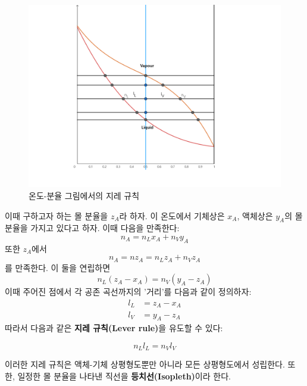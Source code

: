         \begin{figure}[H]
            \centering
            \includegraphics[scale=7]{Images/lgphasediaglever}
            \caption{온도-분율 그림에서의 지레 규칙}\label{f10}
        \end{figure}
        이때 구하고자 하는 몰 분율을 $z_A$라 하자. 이 온도에서 기체상은 $x_A$, 액체상은 $y_A$의 몰 분율을 가지고 있다고 하자. 이때 다음을 만족한다:
        \begin{equation*}
            n_A = n_L x_A + n_V y_A
        \end{equation*}
        또한 $z_A$에서 
        \begin{equation*}
            n_A = nz_A = n_L z_A + n_V z_A
        \end{equation*}
        를 만족한다. 이 둘을 연립하면 
        \begin{equation*}
            n_L\left(z_A - x_A\right) = n_V \left(y_A - z_A\right)
        \end{equation*}
        이때 주어진 점에서 각 공존 곡선까지의 '거리'를 다음과 같이 정의하자:
        \begin{align*}
        l_L &= z_A-x_A\\
        l_V &= y_A-z_A
        \end{align*}
        따라서 다음과 같은 \textbf{지레 규칙(Lever rule)}을 유도할 수 있다:
        \begin{law}[지레 규칙]
        \begin{equation*}
            n_L l_L = n_V l_V
        \end{equation*}
        \end{law}
        이러한 지레 규칙은 액체-기체 상평형도뿐만 아니라 모든 상평형도에서 성립한다. 또한, 일정한 몰 분율을 나타낸 직선을 \textbf{등치선(Isopleth)}이라 한다.
